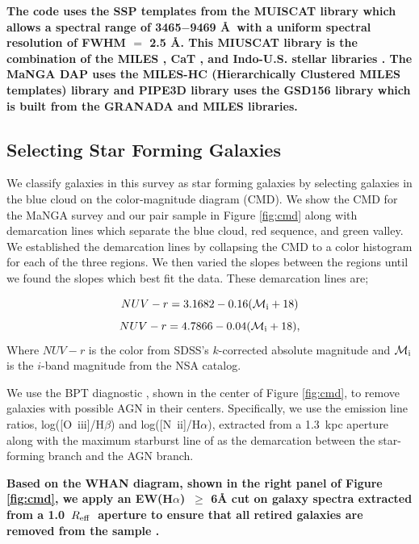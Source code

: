 \documentclass[iop,revtex4,twocolumn,apj,numberedappendix,appendixfloats]{emulateapj}
\newcommand{\reff}{$R_{\rm eff}$}
\newcommand{\ewha}{EW(H$\alpha$)}
\begin{document}
\textbf{
The code uses the SSP templates from the MUISCAT library \citep{Vazdekis:2012} which allows a spectral range of 3465$-$9469 \AA\ with a uniform spectral resolution of FWHM $=$ 2.5 \AA. This MIUSCAT library is the combination of the MILES \citep{Sanchez-Blazquez:2006}, CaT \citep{Cenarro:2001}, and Indo-U.S. stellar libraries \citep{Valdes:2004}. The MaNGA {\sc DAP} uses the MILES-HC (Hierarchically Clustered MILES templates) library \citep{Westfall:2019} and {\sc PIPE3D} library uses the GSD156 library \citep{Cid-Fernandes:2013} which is built from the GRANADA \citep{Martins:2005} and MILES libraries.
}

\subsection{Selecting Star Forming Galaxies}\label{sec:sf}

We classify galaxies in this survey as star forming galaxies by selecting galaxies in the blue cloud on the color-magnitude diagram (CMD). We show the CMD for the MaNGA survey and our pair sample in Figure \ref{fig:cmd} along with demarcation lines which separate the blue cloud, red sequence, and green valley. We established the demarcation lines by collapsing the CMD to a color histogram for each of the three regions. We then varied the slopes between the regions until we found the slopes which best fit the data. These demarcation lines are;

\begin{equation}\label{eq:blue}
NUV-r = 3.1682 - 0.16 (\mathcal{M}_{\rm i}+18)
\end{equation}
\begin{equation}\label{eq:red}
NUV-r = 4.7866 - 0.04 (\mathcal{M}_{\rm i}+18),
\end{equation}
Where $NUV-r$ is the color from SDSS's $k$-corrected absolute magnitude and $\mathcal{M}_{\rm i}$ is the $i$-band magnitude from the NSA catalog. 

We use the BPT diagnostic \citep{Baldwin:1981}, shown in the center of Figure \ref{fig:cmd}, to remove galaxies with possible AGN in their centers. Specifically, we use the emission line ratios, log([O~{\sc iii}]/H$\beta$) and log([N~{\sc ii}]/H$\alpha$), extracted from a 1.3~kpc aperture along with the maximum starburst line of \citet{Kewley:2001} as the demarcation between the star-forming branch and the AGN branch.

\textbf{Based on the WHAN diagram, shown in the right panel of Figure \ref{fig:cmd}, we apply an \ewha\ $\ge$ \textbf{6\AA} cut on galaxy spectra extracted from a 1.0~\reff\ aperture to ensure that all \textbf{retired} galaxies are removed from the sample \citep{Cid-Fernandes:2011}.} 
\end{document}
